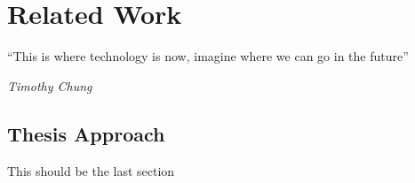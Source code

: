 \chapter{Related Work} %
\label{chap:Chapter3}       %
\epigraph{``This is where technology is now, imagine where we can go in the future” }{\textit{Timothy Chung}}


\section{Thesis Approach}
This should be the last section
